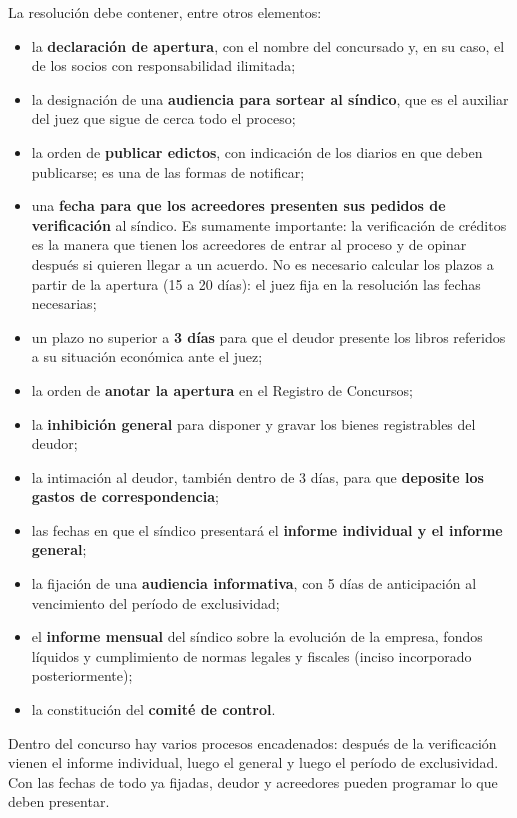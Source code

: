 \documentclass[12pt,oneside]{book}
\begin{document}
La resolución debe contener, entre otros elementos:
\begin{itemize}
    \item la \textbf{declaración de apertura}, con el nombre del concursado y, en su caso, el de los socios con responsabilidad ilimitada;
    \item la designación de una \textbf{audiencia para sortear al síndico}, que es el auxiliar del juez que sigue de cerca todo el proceso;
    \item la orden de \textbf{publicar edictos}, con indicación de los diarios en que deben publicarse; es una de las formas de notificar;
    \item una \textbf{fecha para que los acreedores presenten sus pedidos de verificación} al síndico. Es sumamente importante: la verificación de créditos es la manera que tienen los acreedores de entrar al proceso y de opinar después si quieren llegar a un acuerdo. No es necesario calcular los plazos a partir de la apertura (15 a 20 días): el juez fija en la resolución las fechas necesarias;
    \item un plazo no superior a \textbf{3 días} para que el deudor presente los libros referidos a su situación económica ante el juez;
    \item la orden de \textbf{anotar la apertura} en el Registro de Concursos;
    \item la \textbf{inhibición general} para disponer y gravar los bienes registrables del deudor;
    \item la intimación al deudor, también dentro de 3 días, para que \textbf{deposite los gastos de correspondencia};
    \item las fechas en que el síndico presentará el \textbf{informe individual y el informe general};
    \item la fijación de una \textbf{audiencia informativa}, con 5 días de anticipación al vencimiento del período de exclusividad;
    \item el \textbf{informe mensual} del síndico sobre la evolución de la empresa, fondos líquidos y cumplimiento de normas legales y fiscales (inciso incorporado posteriormente);
    \item la constitución del \textbf{comité de control}.
\end{itemize}

Dentro del concurso hay varios procesos encadenados: después de la verificación vienen el informe individual, luego el general y luego el período de exclusividad. Con las fechas de todo ya fijadas, deudor y acreedores pueden programar lo que deben presentar.
\end{document}
